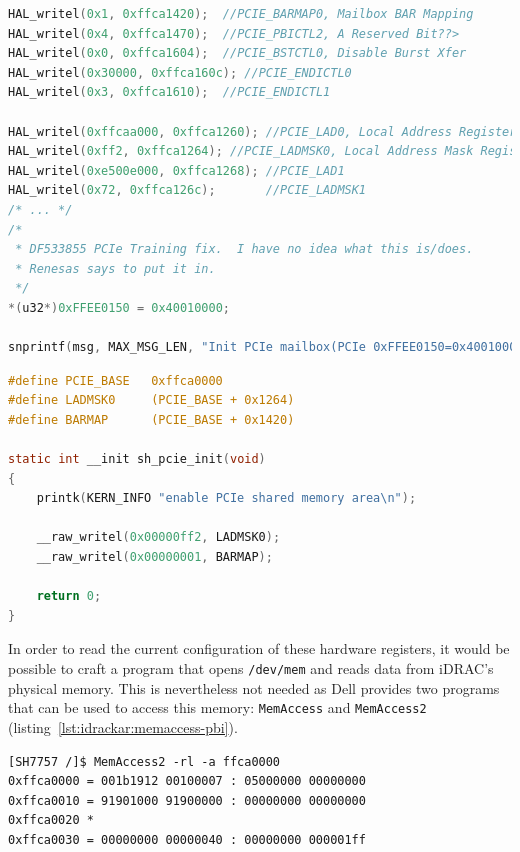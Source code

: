 \begin{lstlisting}[language={C},caption={Extract from U-Boot's function \texttt{init\_mailbox}, in \texttt{externalsrc/ u-boot-idrac8/u-boot\_B0/board/renesas/sh7757lcr/util\_idrac\_main.c}.},label={lst:idrackar:u-boot-init-mailbox}]
HAL_writel(0x1, 0xffca1420);  //PCIE_BARMAP0, Mailbox BAR Mapping
HAL_writel(0x4, 0xffca1470);  //PCIE_PBICTL2, A Reserved Bit??>
HAL_writel(0x0, 0xffca1604);  //PCIE_BSTCTL0, Disable Burst Xfer
HAL_writel(0x30000, 0xffca160c); //PCIE_ENDICTL0
HAL_writel(0x3, 0xffca1610);  //PCIE_ENDICTL1

HAL_writel(0xffcaa000, 0xffca1260); //PCIE_LAD0, Local Address Register 0 
HAL_writel(0xff2, 0xffca1264); //PCIE_LADMSK0, Local Address Mask Register 0 
HAL_writel(0xe500e000, 0xffca1268); //PCIE_LAD1
HAL_writel(0x72, 0xffca126c);       //PCIE_LADMSK1
/* ... */
/* 
 * DF533855 PCIe Training fix.  I have no idea what this is/does.
 * Renesas says to put it in.
 */
*(u32*)0xFFEE0150 = 0x40010000;

snprintf(msg, MAX_MSG_LEN, "Init PCIe mailbox(PCIe 0xFFEE0150=0x40010000)");
\end{lstlisting}

\begin{lstlisting}[language={C},caption={Extract from Dell's Linux source tree, in \texttt{externalsrc/ linux-yocto/arch/sh/boards/board-sh7757lcr.c}.},label={lst:idrackar:linux-pcie-shared}]
#define PCIE_BASE   0xffca0000
#define LADMSK0     (PCIE_BASE + 0x1264)
#define BARMAP      (PCIE_BASE + 0x1420)

static int __init sh_pcie_init(void)
{
    printk(KERN_INFO "enable PCIe shared memory area\n");

    __raw_writel(0x00000ff2, LADMSK0);
    __raw_writel(0x00000001, BARMAP);

    return 0;
}
\end{lstlisting}

In order to read the current configuration of these hardware registers, it would be possible to craft a program that opens \texttt{/dev/mem} and reads data from iDRAC's physical memory.
This is nevertheless not needed as Dell provides two programs that can be used to access this memory: \texttt{MemAccess} and \texttt{MemAccess2} (listing~\ref{lst:idrackar:memaccess-pbi}).

\begin{lstlisting}[language={},caption={Using \texttt{MemAccess2} to read PBI's PCIe configuration.},label={lst:idrackar:memaccess-pbi}]
[SH7757 /]$ MemAccess2 -rl -a ffca0000
0xffca0000 = 001b1912 00100007 : 05000000 00000000
0xffca0010 = 91901000 91900000 : 00000000 00000000
0xffca0020 *
0xffca0030 = 00000000 00000040 : 00000000 000001ff
\end{lstlisting}

